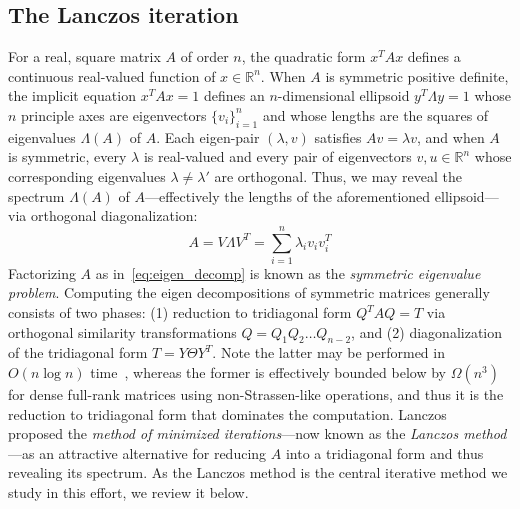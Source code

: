 \documentclass[12pt]{article}
\numberwithin{equation}{section}
\newcommand{\+}{%
	\raisebox{0.18ex}{\scaleobj{0.55}{+}}
}
\theoremstyle{definition}
\begin{document}
\subsection{The Lanczos iteration}
For a real, square matrix $A$ of order $n$, the quadratic form $x^T A x$ defines a continuous real-valued function of $x \in \mathbb{R}^n$. When $A$ is symmetric positive definite, the implicit equation $x^T A x = 1$ defines an $n$-dimensional ellipsoid $y^T \Lambda y = 1$ whose $n$ principle axes are eigenvectors $\{v_i\}_{i=1}^n$ and whose lengths are the squares of eigenvalues $\Lambda(A)$ of $A$.
Each eigen-pair $(\lambda, v)$ satisfies $A v = \lambda v$, and when $A$ is symmetric, every $\lambda$ is real-valued and every pair of eigenvectors $v, u \in \mathbb{R}^n$ whose corresponding eigenvalues $\lambda \neq \lambda'$ are orthogonal.  
Thus, we may reveal the spectrum $\Lambda(A)$ of $A$---effectively the lengths of the aforementioned ellipsoid---via orthogonal diagonalization:
\begin{equation}\label{eq:eigen_decomp}
	A = V \Lambda V^T = \sum\limits_{i=1}^n \lambda_i v_i v_i^T
\end{equation}
Factorizing $A$ as in~\eqref{eq:eigen_decomp} is known as the \emph{symmetric eigenvalue problem}. 
Computing the eigen decompositions of symmetric matrices generally consists of two phases: (1) reduction to tridiagonal form $Q^T A Q = T$ via orthogonal similarity transformations $Q = Q_1 Q_2 \dots Q_{n-2}$, and (2) diagonalization of the tridiagonal form $T = Y \Theta Y^T$. 
Note the latter may be performed in $O(n \log n)$ time~\cite{gu1995divide}, whereas the former is effectively bounded below by $\Omega(n^3)$ for dense full-rank matrices using non-Strassen-like operations, and thus it is the reduction to tridiagonal form that dominates the computation. 
Lanczos~\cite{lanczos1950iteration} proposed the \emph{method of minimized iterations}---now known as the \emph{Lanczos method}---as an attractive alternative for reducing $A$ into a tridiagonal form and thus revealing its spectrum. As the Lanczos method is the central iterative method we study in this effort, we review it below. 
\end{document}
